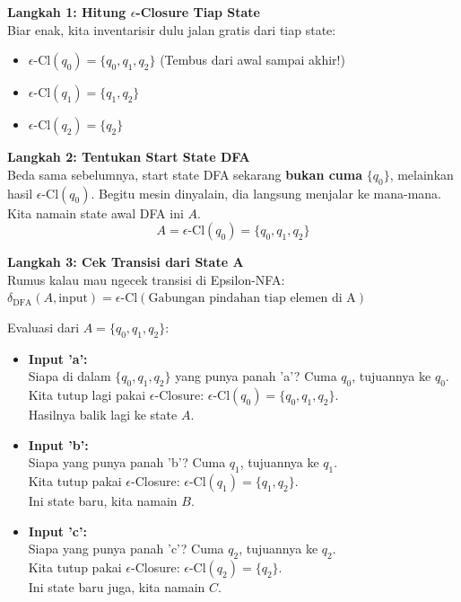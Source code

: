 \documentclass[12pt,a4paper]{article}
\begin{document}
\textbf{Langkah 1: Hitung $\epsilon$-Closure Tiap State} \\
Biar enak, kita inventarisir dulu jalan gratis dari tiap state:
\begin{itemize}
    \item $\epsilon\text{-Cl}(q_0) = \{q_0, q_1, q_2\}$ (Tembus dari awal sampai akhir!)
    \item $\epsilon\text{-Cl}(q_1) = \{q_1, q_2\}$
    \item $\epsilon\text{-Cl}(q_2) = \{q_2\}$
\end{itemize}

\textbf{Langkah 2: Tentukan Start State DFA} \\
Beda sama sebelumnya, start state DFA sekarang \textbf{bukan cuma} $\{q_0\}$, melainkan hasil $\epsilon\text{-Cl}(q_0)$. Begitu mesin dinyalain, dia langsung menjalar ke mana-mana.
Kita namain state awal DFA ini $A$.
\[ A = \epsilon\text{-Cl}(q_0) = \{q_0, q_1, q_2\} \]

\textbf{Langkah 3: Cek Transisi dari State A} \\
Rumus kalau mau ngecek transisi di Epsilon-NFA: \\
$\delta_{\text{DFA}}(A, \text{input}) = \epsilon\text{-Cl}( \text{Gabungan pindahan tiap elemen di A} )$

Evaluasi dari $A = \{q_0, q_1, q_2\}$:
\begin{itemize}
    \item \textbf{Input 'a':} \\
    Siapa di dalam $\{q_0, q_1, q_2\}$ yang punya panah 'a'? Cuma $q_0$, tujuannya ke $q_0$.\\
    Kita tutup lagi pakai $\epsilon$-Closure: $\epsilon\text{-Cl}(q_0) = \{q_0, q_1, q_2\}$.\\
    Hasilnya balik lagi ke state \textbf{$A$}.

    \item \textbf{Input 'b':} \\
    Siapa yang punya panah 'b'? Cuma $q_1$, tujuannya ke $q_1$.\\
    Kita tutup pakai $\epsilon$-Closure: $\epsilon\text{-Cl}(q_1) = \{q_1, q_2\}$.\\
    Ini state baru, kita namain \textbf{$B$}.

    \item \textbf{Input 'c':} \\
    Siapa yang punya panah 'c'? Cuma $q_2$, tujuannya ke $q_2$.\\
    Kita tutup pakai $\epsilon$-Closure: $\epsilon\text{-Cl}(q_2) = \{q_2\}$.\\
    Ini state baru juga, kita namain \textbf{$C$}.
\end{itemize}
\end{document}
